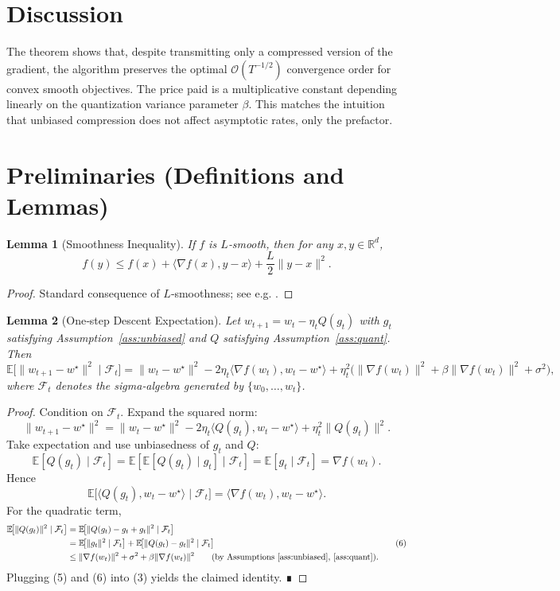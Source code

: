 \documentclass{article}
\newtheorem{lemma}{Lemma}
\newcommand{\E}{\mathbb{E}}
\newcommand{\R}{\mathbb{R}}
\begin{document}
\section*{Discussion}
The theorem shows that, despite transmitting only a compressed version of the gradient, the algorithm preserves the optimal $\mathcal O(T^{-1/2})$ convergence order for convex smooth objectives. The price paid is a multiplicative constant depending linearly on the quantization variance parameter $\beta$. This matches the intuition that unbiased compression does not affect asymptotic rates, only the prefactor.

\newpage
\section*{Preliminaries (Definitions and Lemmas)}
\begin{lemma}[Smoothness Inequality]\label{lem:smooth}
If $f$ is $L$‑smooth, then for any $x,y\in\R^{d}$,
\[
f(y)\le f(x)+\langle\nabla f(x),y-x\rangle+\frac{L}{2}\|y-x\|^{2}.
\]
\end{lemma}
\begin{proof}
Standard consequence of $L$‑smoothness; see e.g. \cite{nesterov2004introductory}.
\end{proof}

\begin{lemma}[One‑step Descent Expectation]\label{lem:onestep}
Let $w_{t+1}=w_{t}-\eta_{t}Q(g_{t})$ with $g_{t}$ satisfying Assumption~\ref{ass:unbiased} and $Q$ satisfying Assumption~\ref{ass:quant}. Then
\[
\E\!\big[\|w_{t+1}-w^{\star}\|^{2}\mid \mathcal{F}_{t}\big]
=
\|w_{t}-w^{\star}\|^{2}
-2\eta_{t}\langle\nabla f(w_{t}),w_{t}-w^{\star}\rangle
+\eta_{t}^{2}\big(\|\nabla f(w_{t})\|^{2}+\beta\|\nabla f(w_{t})\|^{2}+\sigma^{2}\big),
\]
where $\mathcal{F}_{t}$ denotes the sigma‑algebra generated by $\{w_{0},\dots,w_{t}\}$.
\end{lemma}
\begin{proof}
Condition on $\mathcal{F}_{t}$. Expand the squared norm:
\[
\|w_{t+1}-w^{\star}\|^{2}
=\|w_{t}-w^{\star}\|^{2}
-2\eta_{t}\langle Q(g_{t}),w_{t}-w^{\star}\rangle
+\eta_{t}^{2}\|Q(g_{t})\|^{2}.
\tag{3}
\]
Take expectation and use unbiasedness of $g_{t}$ and $Q$:
\[
\E[Q(g_{t})\mid\mathcal{F}_{t}]
=\E[\E[Q(g_{t})\mid g_{t}]\mid\mathcal{F}_{t}]
=\E[g_{t}\mid\mathcal{F}_{t}]
=\nabla f(w_{t}).
\tag{4}
\]
Hence
\[
\E\!\big[\langle Q(g_{t}),w_{t}-w^{\star}\rangle\mid\mathcal{F}_{t}\big]
=\langle\nabla f(w_{t}),w_{t}-w^{\star}\rangle.
\tag{5}
\]
For the quadratic term,
\[
\begin{aligned}
\E\!\big[\|Q(g_{t})\|^{2}\mid\mathcal{F}_{t}\big]
&=\E\!\big[\|Q(g_{t})-g_{t}+g_{t}\|^{2}\mid\mathcal{F}_{t}\big] \\
&=\E\!\big[\|g_{t}\|^{2}\mid\mathcal{F}_{t}\big]
+\E\!\big[\|Q(g_{t})-g_{t}\|^{2}\mid\mathcal{F}_{t}\big] \\
&\le \|\nabla f(w_{t})\|^{2}+\sigma^{2}
+\beta\|\nabla f(w_{t})\|^{2} \qquad\text{(by Assumptions~\ref{ass:unbiased},~\ref{ass:quant})}.
\end{aligned}
\tag{6}
\]
Plugging (5) and (6) into (3) yields the claimed identity. ∎
\end{proof}
\end{document}
